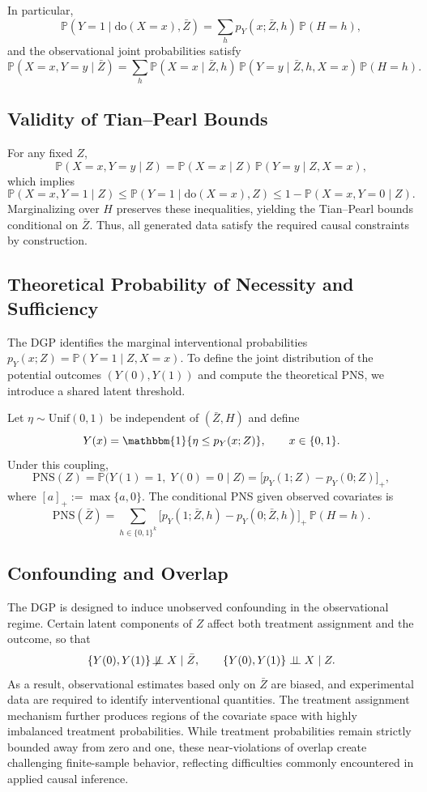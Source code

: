 \documentclass[accepted]{uai2026} %
\theoremstyle{plain}
\theoremstyle{definition}
\theoremstyle{remark}
\begin{document}
In particular,
\[
\mathbb{P}(Y=1 \mid \mathrm{do}(X=x), \bar{Z})
=
\sum_{h} p_Y(x;\bar{Z},h)\,\mathbb{P}(H=h),
\]
and the observational joint probabilities satisfy
\[
\mathbb{P}(X=x,Y=y \mid \bar{Z})
=
\sum_{h}
\mathbb{P}(X=x \mid \bar{Z},h)\,
\mathbb{P}(Y=y \mid \bar{Z},h,X=x)\,
\mathbb{P}(H=h).
\]

\subsection{Validity of Tian--Pearl Bounds}

For any fixed $Z$,
\[
\mathbb{P}(X=x,Y=y \mid Z)
=
\mathbb{P}(X=x \mid Z)\,
\mathbb{P}(Y=y \mid Z,X=x),
\]
which implies
\[
\mathbb{P}(X=x,Y=1 \mid Z)
\le
\mathbb{P}(Y=1 \mid \mathrm{do}(X=x), Z)
\le
1 - \mathbb{P}(X=x,Y=0 \mid Z).
\]
Marginalizing over $H$ preserves these inequalities, yielding the
Tian--Pearl bounds conditional on $\bar{Z}$.
Thus, all generated data satisfy the required causal constraints by construction.

\subsection{Theoretical Probability of Necessity and Sufficiency}

The DGP identifies the marginal interventional probabilities
$p_Y(x;Z)=\mathbb{P}(Y=1\mid Z,X=x)$.
To define the joint distribution of the potential outcomes $(Y(0),Y(1))$
and compute the theoretical PNS, we introduce a shared latent threshold.

Let $\eta \sim \mathrm{Unif}(0,1)$ be independent of $(\bar{Z},H)$ and define
\[
Y(x) = \mathbbm{1}\{\eta \le p_Y(x;Z)\}, \qquad x \in \{0,1\}.
\]
Under this coupling,
\[
\mathrm{PNS}(Z)
=
\mathbb{P}\big(Y(1)=1,\;Y(0)=0 \mid Z\big)
=
\big[p_Y(1;Z)-p_Y(0;Z)\big]_+,
\]
where $[a]_+ := \max\{a,0\}$.
The conditional PNS given observed covariates is
\[
\mathrm{PNS}(\bar{Z})
=
\sum_{h \in \{0,1\}^k}
\big[p_Y(1;\bar{Z},h)-p_Y(0;\bar{Z},h)\big]_+ \,
\mathbb{P}(H=h).
\]

\subsection{Confounding and Overlap}

The DGP is designed to induce unobserved confounding in the observational regime.
Certain latent components of $Z$ affect both treatment assignment and the outcome,
so that
\[
\{Y(0),Y(1)\} \not\!\perp\!\!\!\perp X \mid \bar{Z},
\qquad
\{Y(0),Y(1)\} \perp\!\!\!\perp X \mid Z.
\]
As a result, observational estimates based only on $\bar{Z}$ are biased, and
experimental data are required to identify interventional quantities.
The treatment assignment mechanism further produces regions of the covariate
space with highly imbalanced treatment probabilities.
While treatment probabilities remain strictly bounded away from zero and one,
these near-violations of overlap create challenging finite-sample behavior,
reflecting difficulties commonly encountered in applied causal inference.
\end{document}
